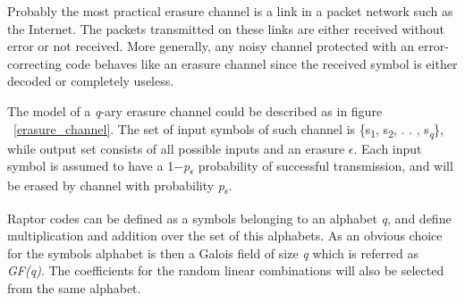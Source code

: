 Probably the most practical erasure channel is a link in a packet network such as the Internet. The packets transmitted on these links are either received without error or not received. More generally, any noisy channel protected with an error-correcting code behaves like an erasure channel since the received symbol is either decoded or completely useless.
\par
The model of a \textit{q}-ary erasure channel could be described as in figure ~\ref{erasure_channel}. The set of input symbols of such channel is \{s\textsubscript{1}, s\textsubscript{2}, . . , s\textsubscript{\textit{q}}\}, while output set consists of all possible inputs and an erasure $\epsilon$. Each input symbol is assumed to have a 1$-$\textit{p\textsubscript{$\epsilon$}} probability of successful transmission, and will be erased by channel with probability \textit{p\textsubscript{$\epsilon$}}. 

Raptor codes can be defined as a symbols belonging to an alphabet \textit{q}, and define multiplication and addition over the set of this alphabets. As an obvious choice for the symbol\textquotesingle s  alphabet is then a Galois field of size \textit{q} which is referred as \textit{GF(q)}. The coefficients for the random linear combinations will also be selected from the same alphabet.



